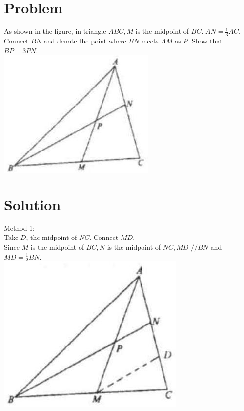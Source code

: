 \documentclass{article}
\begin{document}
\section*{Problem}
As shown in the figure, in triangle \(A B C, M\) is the midpoint of \(B C\). \(A N=\frac{1}{3} A C\). Connect \(B N\) and denote the point where \(B N\) meets \(A M\) as \(P\). Show that \(B P=3 P N\).\\
\centering
\includegraphics[width=\textwidth]{images/044.jpg}

\section*{Solution}
Method 1:\\
Take \(D\), the midpoint of \(N C\). Connect \(M D\).\\
Since \(M\) is the midpoint of \(B C, N\) is the midpoint of \(N C, M D\) \(/ / B N\) and \(M D=\frac{1}{2} B N\).\\
\centering
\includegraphics[width=\textwidth]{images/047.jpg}
\end{document}
